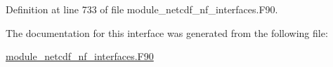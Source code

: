 Definition at line 733 of file module\+\_\+netcdf\+\_\+nf\+\_\+interfaces.\+F90.



The documentation for this interface was generated from the following file\+:\begin{DoxyCompactItemize}
\item 
\hyperlink{module__netcdf__nf__interfaces_8F90}{module\+\_\+netcdf\+\_\+nf\+\_\+interfaces.\+F90}\end{DoxyCompactItemize}
